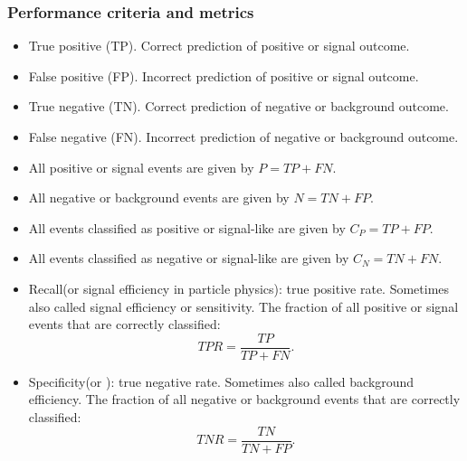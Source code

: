 \documentclass[12pt,a4paper]{article}
\begin{document}
\subsubsection{Performance criteria and metrics}
\begin{itemize}
    \item True positive (TP). Correct prediction of positive or signal outcome.
    \item False positive (FP). Incorrect prediction of positive or signal outcome.
    \item True negative (TN). Correct prediction of negative or background outcome.
    \item False negative (FN). Incorrect prediction of negative or background outcome.
    \item All positive or signal events are given by $P=T P+F N$.
    \item All negative or background events are given by $N=T N+F P$.
    \item All events classified as positive or signal-like are given by $C_P=T P+F P$.
    \item All events classified as negative or signal-like are given by $C_N=T N+F N$.
    \item Recall(or signal efficiency in particle physics): true positive rate. Sometimes also called signal efficiency or sensitivity. The fraction of all positive or signal events that are correctly classified:
    $$
    T P R=\frac{T P}{T P+F N} .
    $$
    \item Specificity(or ): true negative rate. Sometimes also called background efficiency. The fraction of all negative or background events that are correctly classified:
    $$
    T N R=\frac{T N}{T N+F P} .
    $$
    

\end{itemize}
\end{document}
